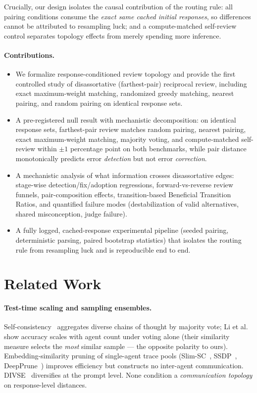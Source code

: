 \documentclass[11pt]{article}
\begin{document}
Crucially, our design isolates the causal contribution of the routing rule: all pairing conditions consume the \emph{exact same cached initial responses}, so differences cannot be attributed to resampling luck; and a compute-matched self-review control separates topology effects from merely spending more inference.

\paragraph{Contributions.}
\begin{itemize}
\item We formalize response-conditioned review topology and provide the first controlled study of disassortative (farthest-pair) reciprocal review, including exact maximum-weight matching, randomized greedy matching, nearest pairing, and random pairing on identical response sets.
\item A pre-registered null result with mechanistic decomposition: on identical response sets, farthest-pair review matches random pairing, nearest pairing, exact maximum-weight matching, majority voting, and compute-matched self-review within $\pm 1$ percentage point on both benchmarks, while pair distance monotonically predicts error \emph{detection} but not error \emph{correction}.
\item A mechanistic analysis of what information crosses disassortative edges: stage-wise detection/fix/adoption regressions, forward-vs-reverse review funnels, pair-composition effects, transition-based Beneficial Transition Ratios, and quantified failure modes (destabilization of valid alternatives, shared misconception, judge failure).
\item A fully logged, cached-response experimental pipeline (seeded pairing, deterministic parsing, paired bootstrap statistics) that isolates the routing rule from resampling luck and is reproducible end to end.
\end{itemize}

\section{Related Work}
\label{sec:related}

\paragraph{Test-time scaling and sampling ensembles.}
Self-consistency~\cite{wang2022selfconsistency} aggregates diverse chains of thought by majority vote; Li et al.~\cite{li2024moreagents} show accuracy scales with agent count under voting alone (their similarity measure selects the \emph{most} similar sample — the opposite polarity to ours). Embedding-similarity pruning of single-agent trace pools (Slim-SC~\cite{slimsc}, SSDP~\cite{ssdp}, DeepPrune~\cite{deepprune}) improves efficiency but constructs no inter-agent communication. DIVSE~\cite{divse} diversifies at the prompt level. None condition a \emph{communication topology} on response-level distances.
\end{document}
